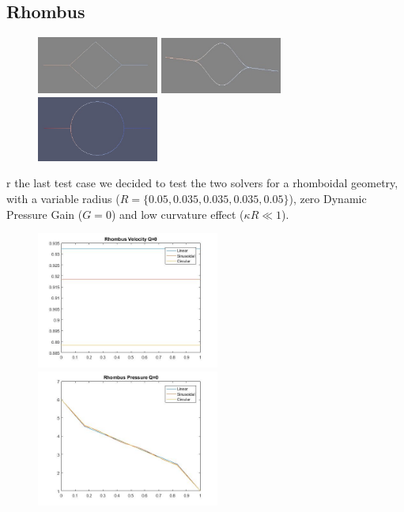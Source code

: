 \documentclass[a4paper]{report}
\begin{document}
\subsection{Rhombus}
\begin{figure}[htbp]
\centering
\includegraphics[width= 40mm]{Rombo_Rettilineo}%
\qquad \qquad
\includegraphics[width= 40mm]{Rombo_Curvo}%
\qquad \qquad
\includegraphics[width= 40mm]{Circular_rhombus}%
\end{figure}
r the last test case we decided to test the two solvers for a rhomboidal geometry, with a variable radius ($R=\{0.05,0.035, 0.035, 0.035,0.05\}$), zero Dynamic Pressure Gain ($G=0$) and low curvature effect ($\kappa R\ll1$).
\begin{figure}[htbp]
\centering
\includegraphics[width= 60mm]{Rombus_Velocity0}%
\qquad \qquad
\includegraphics[width= 60mm]{Rombus_Pressure0}
\end{figure}
\end{document}
